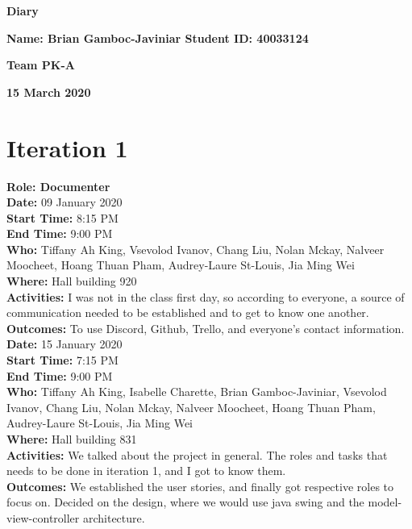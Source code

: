 \documentclass[12pt]{article}
\begin{document}
\vspace*{0.2in}
\centerline{\bf\Large Diary}

\vspace*{0.2in}
\centerline{\bf\Large Name: Brian Gamboc-Javiniar   Student ID: 40033124}

\vspace*{0.2in}
\centerline{\bf\Large Team PK-A}

\vspace*{0.2in}
\centerline{\bf\Large 15 March 2020}

\section{Iteration 1}

\textbf{Role: Documenter} \\

{\bf Date:} 09 January 2020\\
{\bf Start Time:} 8:15 PM\\
{\bf End Time:} 9:00 PM \\
{\bf Who:} Tiffany Ah King, Vsevolod Ivanov, Chang Liu, Nolan Mckay, Nalveer Moocheet, Hoang Thuan Pham, Audrey-Laure St-Louis, Jia Ming Wei\\
{\bf Where:} Hall building 920 \\
{\bf Activities:} I was not in the class first day, so according to everyone, a source of communication needed to be established and to get to know one another.\\
{\bf Outcomes:} To use Discord, Github, Trello, and everyone's contact information.\\

{\bf Date:} 15 January 2020\\
{\bf Start Time:} 7:15 PM\\
{\bf End Time:} 9:00 PM \\
{\bf Who:} Tiffany Ah King, Isabelle Charette, Brian Gamboc-Javiniar, Vsevolod Ivanov, Chang Liu, Nolan Mckay, Nalveer Moocheet, Hoang Thuan Pham, Audrey-Laure St-Louis, Jia Ming Wei\\
{\bf Where:} Hall building 831 \\
{\bf Activities:} We talked about the project in general. The roles and tasks that needs to be done in iteration 1, and I got to know them.\\
{\bf Outcomes:} We established the user stories, and finally got respective roles to focus on. Decided on the design, where we would use java swing and the model-view-controller architecture.\\
\end{document}
